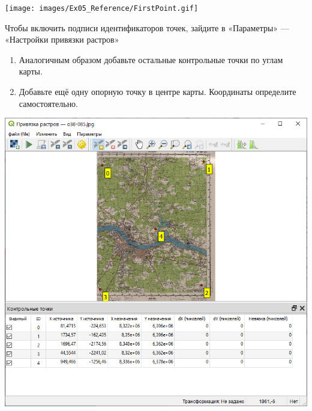 \documentclass[
  12pt,
]{book}
\begin{document}
\texttt{[image: images/Ex05\_Reference/FirstPoint.gif]}

Чтобы включить подписи идентификаторов точек, зайдите в «Параметры» --- «Настройки привязки растров»

\begin{enumerate}
\def\labelenumi{\arabic{enumi}.}
\setcounter{enumi}{7}
\item
  Аналогичным образом добавьте остальные контрольные точки по углам карты.
\item
  Добавьте ещё одну опорную точку в центре карты. Координаты определите самостоятельно.
\end{enumerate}

\includegraphics{images/Ex05_Reference/RasterReference2.png}
\end{document}
